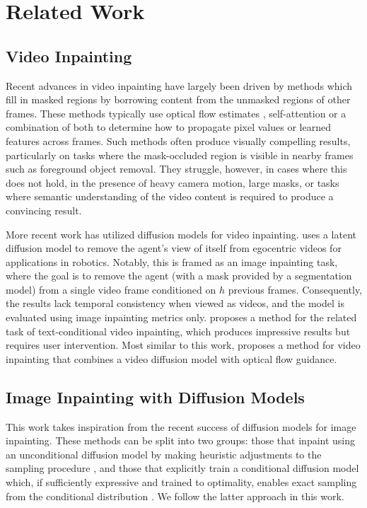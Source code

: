 
\chapter{Related Work}
\section{Video Inpainting} 
Recent advances in video inpainting have largely been driven by methods which fill in masked regions by borrowing content from the unmasked regions of other frames. These methods typically use optical flow estimates \citep{temporally, deepvideoinpainting, dfvi, flowedgeguided}, self-attention \citep{learningjoint, fuseformer, onionpeel, copypaste} or a combination of both \citep{propainter, fgt, endtoend} to determine how to propagate pixel values or learned features across frames. Such methods often produce visually compelling results, particularly on tasks where the mask-occluded region is visible in nearby frames such as foreground object removal. They struggle, however, in cases where this does not hold, \eg in the presence of heavy camera motion, large masks, or tasks where semantic understanding of the video content is required to produce a convincing result.

More recent work has utilized diffusion models for video inpainting. \citet{lookmanohands} uses a latent diffusion model \citep{stablediffusion, vahdat2021score} to remove the agent's view of itself from egocentric videos for applications in robotics. Notably, this is framed as an image inpainting task, where the goal is to remove the agent (with a mask provided by a segmentation model) from a single video frame conditioned on $h$ previous frames. Consequently, the results lack temporal consistency when viewed as videos, and the model is evaluated using image inpainting metrics only. \citet{avid} proposes a method for the related task of text-conditional video inpainting, which produces impressive results but requires user intervention. Most similar to this work, \citet{fgdvi} proposes a method for video inpainting that combines a video diffusion model with optical flow guidance. 


\section{Image Inpainting with Diffusion Models}
This work takes inspiration from the recent success of diffusion models for image inpainting. These methods can be split into two groups: those that inpaint using an unconditional diffusion model by making heuristic adjustments to the sampling procedure \citep{repaint, copaint}, and those that explicitly train a conditional diffusion model which, if sufficiently expressive and trained to optimality, enables exact sampling from the conditional distribution \citep{palette,zhang2023adding}. We follow the latter approach in this work.









